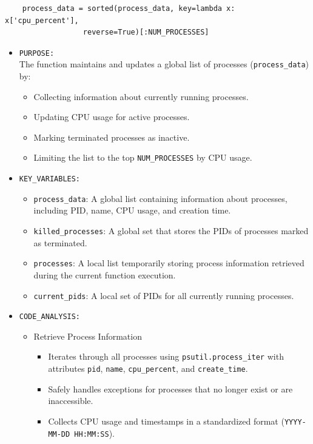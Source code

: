 \documentclass[12pt]{article}
\begin{document}
\begin{itemize}
\begin{verbatim}
    process_data = sorted(process_data, key=lambda x: x['cpu_percent'],
                  reverse=True)[:NUM_PROCESSES]
\end{verbatim}

 \begin{itemize}
    \item \texttt{PURPOSE:}
    \\
       The function maintains and updates a global list of processes (\texttt{process\_data}) by:
\begin{itemize}
    \item Collecting information about currently running processes.
    \item Updating CPU usage for active processes.
    \item Marking terminated processes as inactive.
    \item Limiting the list to the top \texttt{NUM\_PROCESSES} by CPU usage.
\end{itemize}
    
   \item \texttt{KEY\_VARIABLES:}
   \begin{itemize}
    \item \texttt{process\_data}: A global list containing information about processes, including PID, name, CPU usage, and creation time.
    \item \texttt{killed\_processes}: A global set that stores the PIDs of processes marked as terminated.
    \item \texttt{processes}: A local list temporarily storing process information retrieved during the current function execution.
    \item \texttt{current\_pids}: A local set of PIDs for all currently running processes.
\end{itemize}
   \item \texttt{CODE\_ANALYSIS:}
   \begin{itemize}
       \item {Retrieve Process Information}
\begin{itemize}
    \item Iterates through all processes using \texttt{psutil.process\_iter} with attributes \texttt{pid}, \texttt{name}, \texttt{cpu\_percent}, and \texttt{create\_time}.
    \item Safely handles exceptions for processes that no longer exist or are inaccessible.
    \item Collects CPU usage and timestamps in a standardized format (\texttt{YYYY-MM-DD HH:MM:SS}).
\end{itemize}


\end{itemize}
\end{itemize}
\end{itemize}
\end{document}
